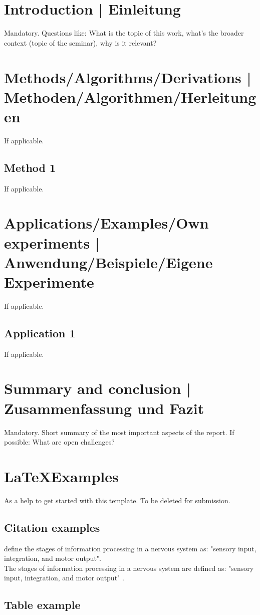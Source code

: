 \section{Introduction | Einleitung}
Mandatory. Questions like: What is the topic of this work, what's the broader context (topic of the seminar), why is it relevant?


\section{Methods/Algorithms/Derivations | Methoden/Algorithmen/Herleitungen}
If applicable.
\subsection{Method 1}
If applicable.


\section{Applications/Examples/Own experiments | Anwendung/Beispiele/Eigene Experimente}
If applicable.
\subsection{Application 1}
If applicable.


\section{Summary and conclusion | Zusammenfassung und Fazit}
Mandatory. Short summary of the most important aspects of the report.
If possible: What are open challenges?

\newpage
\section{\LaTeX Examples}
As a help to get started with this template. To be deleted for submission.
\subsection{Citation examples}
\citet{campbell:2017} define the stages of information processing in a nervous system as: "sensory input, integration, and motor output". \\
The stages of information processing in a nervous system are defined as: "sensory input, integration, and motor output" \citep{campbell:2017}. 

\subsection{Table example}


